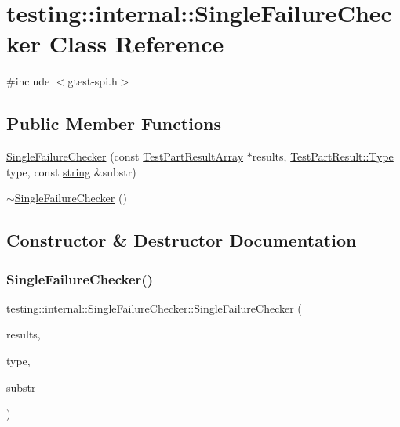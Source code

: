 \hypertarget{classtesting_1_1internal_1_1_single_failure_checker}{}\section{testing\+::internal\+::Single\+Failure\+Checker Class Reference}
\label{classtesting_1_1internal_1_1_single_failure_checker}


{\ttfamily \#include $<$gtest-\/spi.\+h$>$}

\subsection*{Public Member Functions}
\begin{DoxyCompactItemize}
\item 
\mbox{\hyperlink{classtesting_1_1internal_1_1_single_failure_checker_a6d350d385526c97c9982e928f5f8fb56}{Single\+Failure\+Checker}} (const \mbox{\hyperlink{classtesting_1_1_test_part_result_array}{Test\+Part\+Result\+Array}} $\ast$results, \mbox{\hyperlink{classtesting_1_1_test_part_result_a65ae656b33fdfdfffaf34858778a52d5}{Test\+Part\+Result\+::\+Type}} type, const \mbox{\hyperlink{namespacetesting_1_1internal_a8e8ff5b11e64078831112677156cb111}{string}} \&substr)
\item 
\mbox{\hyperlink{classtesting_1_1internal_1_1_single_failure_checker_a4b0a907c9c1b350c79d70af138e9f0bf}{$\sim$\+Single\+Failure\+Checker}} ()
\end{DoxyCompactItemize}


\subsection{Constructor \& Destructor Documentation}
\mbox{\label{classtesting_1_1internal_1_1_single_failure_checker_a6d350d385526c97c9982e928f5f8fb56}} 
\subsubsection{\texorpdfstring{SingleFailureChecker()}{SingleFailureChecker()}}
{\footnotesize\ttfamily testing\+::internal\+::\+Single\+Failure\+Checker\+::\+Single\+Failure\+Checker (\begin{DoxyParamCaption}\item[{const \mbox{\hyperlink{classtesting_1_1_test_part_result_array}{Test\+Part\+Result\+Array}} $\ast$}]{results,  }\item[{\mbox{\hyperlink{classtesting_1_1_test_part_result_a65ae656b33fdfdfffaf34858778a52d5}{Test\+Part\+Result\+::\+Type}}}]{type,  }\item[{const \mbox{\hyperlink{namespacetesting_1_1internal_a8e8ff5b11e64078831112677156cb111}{string}} \&}]{substr }\end{DoxyParamCaption})}

